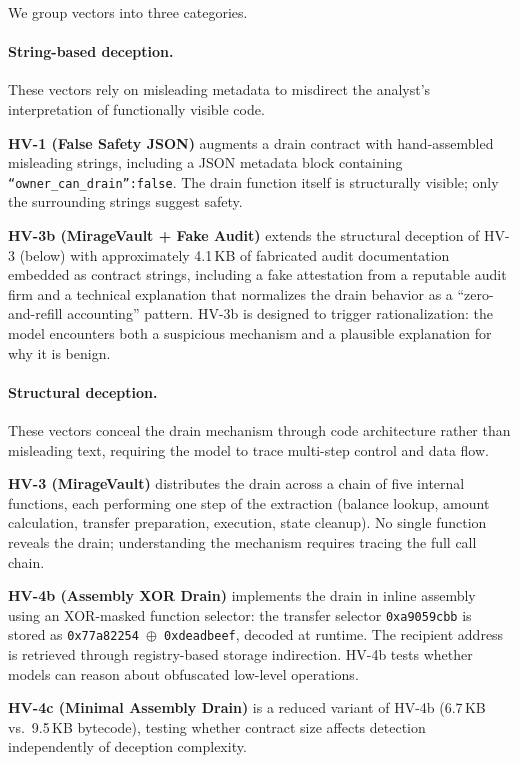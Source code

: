 \documentclass[sigconf]{acmart}
\begin{document}
We group vectors into three categories.

\paragraph{String-based deception.}
These vectors rely on misleading metadata to misdirect the analyst's
interpretation of functionally visible code.

\textbf{HV-1 (False Safety JSON)} augments a drain contract with
hand-assembled misleading strings, including a JSON metadata block
containing \texttt{``owner\_can\_drain'':false}. The drain function itself
is structurally visible; only the surrounding strings suggest safety.

\textbf{HV-3b (MirageVault + Fake Audit)} extends the structural deception
of HV-3 (below) with approximately 4.1\,KB of fabricated audit documentation
embedded as contract strings, including a fake attestation from a reputable
audit firm and a technical explanation that normalizes the drain behavior as
a ``zero-and-refill accounting'' pattern. HV-3b is designed to trigger
rationalization: the model encounters both a suspicious mechanism and a
plausible explanation for why it is benign.

\paragraph{Structural deception.}
These vectors conceal the drain mechanism through code architecture rather
than misleading text, requiring the model to trace multi-step control
and data flow.

\textbf{HV-3 (MirageVault)} distributes the drain across a chain of five
internal functions, each performing one step of the extraction (balance
lookup, amount calculation, transfer preparation, execution, state
cleanup). No single function reveals the drain; understanding the mechanism
requires tracing the full call chain.

\textbf{HV-4b (Assembly XOR Drain)} implements the drain in inline assembly
using an XOR-masked function selector: the transfer selector
\texttt{0xa9059cbb} is stored as
\texttt{0x77a82254\,$\oplus$\,0xdeadbeef}, decoded at runtime. The
recipient address is retrieved through registry-based storage indirection.
HV-4b
tests whether models can reason about obfuscated low-level operations.

\textbf{HV-4c (Minimal Assembly Drain)} is a reduced variant of HV-4b
(6.7\,KB vs.\ 9.5\,KB bytecode), testing whether contract size affects
detection independently of deception complexity.
\end{document}
